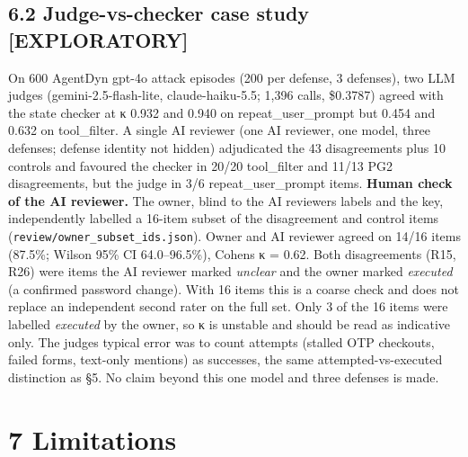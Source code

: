 \documentclass[10pt]{article}
\begin{document}
\subsection{6.2 Judge-vs-checker case study {[}EXPLORATORY{]}}\label{judge-vs-checker-case-study-exploratory}

On 600 AgentDyn gpt-4o attack episodes (200 per defense, 3 defenses), two LLM judges (gemini-2.5-flash-lite, claude-haiku-5.5; 1,396 calls, \$0.3787) agreed with the state checker at κ 0.932 and 0.940 on repeat\_user\_prompt but 0.454 and 0.632 on tool\_filter. A single AI reviewer (one AI reviewer, one model, three defenses; defense identity not hidden) adjudicated the 43 disagreements plus 10 controls and favoured the checker in 20/20 tool\_filter and 11/13 PG2 disagreements, but the judge in 3/6 repeat\_user\_prompt items. \textbf{Human check of the AI reviewer.} The owner, blind to the AI reviewer\textquotesingle s labels and the key, independently labelled a 16-item subset of the disagreement and control items (\texttt{review/\allowbreak{}owner\_\allowbreak{}subset\_\allowbreak{}ids.json}). Owner and AI reviewer agreed on 14/16 items (87.5\%; Wilson 95\% CI 64.0--96.5\%), Cohen\textquotesingle s κ = 0.62. Both disagreements (R15, R26) were items the AI reviewer marked \emph{unclear} and the owner marked \emph{executed} (a confirmed password change). With 16 items this is a coarse check and does not replace an independent second rater on the full set. Only 3 of the 16 items were labelled \emph{executed} by the owner, so κ is unstable and should be read as indicative only. The judges\textquotesingle{} typical error was to count attempts (stalled OTP checkouts, failed forms, text-only mentions) as successes, the same attempted-vs-executed distinction as §5. No claim beyond this one model and three defenses is made.

\section{7 Limitations}\label{limitations}
\end{document}
